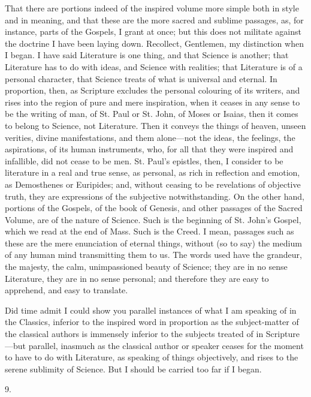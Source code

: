 That there are portions indeed of the inspired volume more simple
both in style and in meaning, and that these are the more sacred and
sublime passages, as, for instance, parts of the Gospels, I grant at
once; but this does not militate against the doctrine I have been
laying down. Recollect, Gentlemen, my distinction when I began. I have
said Literature is one thing, and that Science is another; that
Literature has to do with ideas, and Science with realities; that
Literature is of a personal character, that Science treats of what is
universal and eternal. In proportion, then, as Scripture excludes the
personal colouring of its writers, and rises into the region of pure
and mere inspiration, when it ceases in any sense to be the writing of
man, of St. Paul or St. John, of Moses or Isaias, then it comes
to belong to Science, not Literature. Then it conveys the things of
heaven, unseen verities, divine manifestations, and them alone—not
the ideas, the feelings, the aspirations, of its human instruments,
who, for all that they were inspired and infallible, did not cease to
be men. St. Paul's epistles, then, I consider to be literature in a
real and true sense, as personal, as rich in reflection and emotion,
as Demosthenes or Euripides; and, without ceasing to be revelations of
objective truth, they are expressions of the subjective
notwithstanding. On the other hand, portions of the Gospels, of the
book of Genesis, and other passages of the Sacred Volume, are of the
nature of Science. Such is the beginning of St. John's Gospel, which
we read at the end of Mass. Such is the Creed. I mean, passages such
as these are the mere enunciation of eternal things, without (so to
say) the medium of any human mind transmitting them to us. The words
used have the grandeur, the majesty, the calm, unimpassioned beauty of
Science; they are in no sense Literature, they are in no sense
personal; and therefore they are easy to apprehend, and easy to
translate.

Did time admit I could show you parallel instances of what I am
speaking of in the Classics, inferior to the inspired word in
proportion as the subject-matter of the classical authors is immensely
inferior to the subjects treated of in Scripture—but parallel,
inasmuch as the classical author or speaker ceases for the moment to
have to do with Literature, as speaking of things objectively, and
rises to the serene sublimity of Science. But I should be carried too
far if I began.

9.

